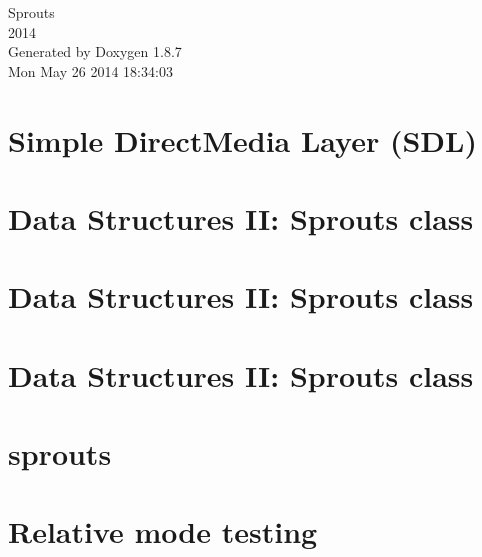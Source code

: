 \documentclass[twoside]{book}
\newcommand{\+}{\discretionary{\mbox{\scriptsize$\hookleftarrow$}}{}{}}
\newcommand{\clearemptydoublepage}{%
  \newpage{\pagestyle{empty}\cleardoublepage}%
}
\begin{document}
\hypersetup{pageanchor=false,
             bookmarks=true,
             bookmarksnumbered=true,
             pdfencoding=unicode
            }
\begin{titlepage}
\vspace*{7cm}
\begin{center}%
{\Large Sprouts \\[1ex]\large 2014 }\\
\vspace*{1cm}
{\large Generated by Doxygen 1.8.7}\\
\vspace*{0.5cm}
{\small Mon May 26 2014 18:34:03}\\
\end{center}
\end{titlepage}
\clearemptydoublepage
\tableofcontents
\clearemptydoublepage
{}
\hypersetup{pageanchor=true}

\chapter{Simple Direct\+Media Layer (S\+D\+L)}
\label{index}\hypertarget{index}{}
\chapter{Data Structures I\+I\+: Sprouts class}
\label{md_docs_04-24-2014}
\hypertarget{md_docs_04-24-2014}{}

\chapter{Data Structures I\+I\+: Sprouts class}
\label{md_docs_04-28-2014}
\hypertarget{md_docs_04-28-2014}{}

\chapter{Data Structures I\+I\+: Sprouts class}
\label{md_docs_05-01-2014}
\hypertarget{md_docs_05-01-2014}{}

\chapter{sprouts}
\label{md_README}
\hypertarget{md_README}{}

\chapter{Relative mode testing}
\label{md_SDL2-2_80_83_test_relative_mode}
\hypertarget{md_SDL2-2_80_83_test_relative_mode}{}

\end{document}
